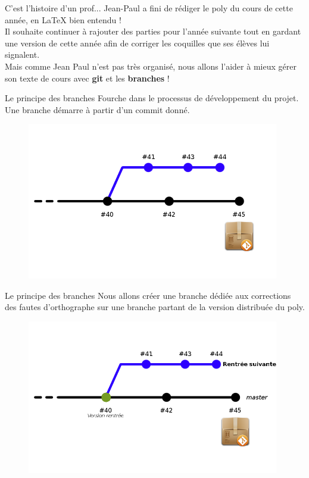 \documentclass{beamer}
\begin{document}
\begin{frame}{C'est l'histoire d'un prof...}
	Jean-Paul a fini de rédiger le poly du cours de cette année, en \LaTeX{} bien entendu !\\
	
	
	Il souhaite continuer à rajouter des parties pour l'année suivante tout en gardant une version de cette année afin de corriger les coquilles que ses élèves lui signalent.\\
	Mais comme Jean Paul n'est pas très organisé, nous allons l'aider à mieux gérer son texte de cours avec \textbf{git} et les \textbf{branches} !	
\end{frame}

\begin{frame}{Le principe des branches}
	Fourche dans le processus de développement du projet. Une branche démarre à partir d'un commit donné.
	
	\begin{figure}
		\centering
		\includegraphics[width=11cm]{img/repo4}
	\end{figure}
\end{frame}

\begin{frame}{Le principe des branches}
	Nous allons créer une branche dédiée aux corrections des fautes d'orthographe sur une branche partant de la version distribuée du poly.
	
	\begin{figure}
		\centering
		\includegraphics[width=11cm]{img/repo4-2}
	\end{figure}
\end{frame}
\end{document}
